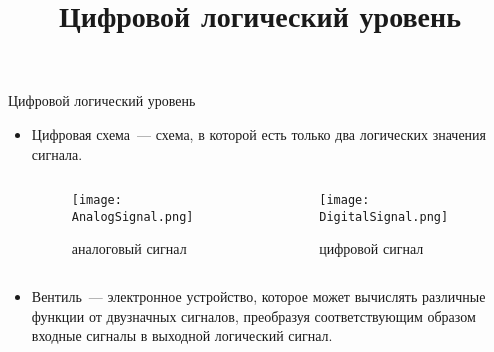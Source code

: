 \documentclass[aspectratio=169,14pt]{beamer}
\title{Цифровой логический уровень}
\begin{document}
\begin{frame}{Цифровой логический уровень}
    \begin{itemize}
        \pause
        \item Цифровая схема~--- схема, в которой есть только два логических значения сигнала.
        \pause
        \begin{columns}[T,onlytextwidth]
            \begin{column}{0.5\textwidth}
                \begin{figure}[htp]
                    \centering
                    \texttt{[image: AnalogSignal.png]}
                    \caption{\tiny{аналоговый сигнал}}
                    \label{fig:AnalogSignal}
                \end{figure}
            \end{column}
            \begin{column}{0.5\textwidth}
                \begin{figure}[htp]
                    \centering
                    \texttt{[image: DigitalSignal.png]}
                    \caption{\tiny{цифровой сигнал}}
                    \label{fig:DigitalSignal}
                \end{figure}
            \end{column}
        \end{columns}
            \pause
        \item Вентиль~--- электронное устройство, которое может вычислять различные функции от двузначных сигналов, преобразуя соответствующим образом входные сигналы в выходной логический сигнал.
    \end{itemize}
\end{frame}
\end{document}
